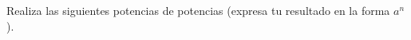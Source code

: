 \question[10] Realiza las siguientes potencias de potencias (expresa tu resultado en la forma $a^n$).
\begin{multicols}{2}
    \begin{parts}
        { \printanswers
            
        }
        
        
        
        
        
        
        
        
        
        
    \end{parts}
\end{multicols}
